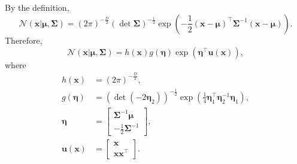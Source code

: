 \subsection{}
\label{2.57}
By the definition,
%
\begin{equation}
\mathcal{N} (\mathbf{x} | \bm{\mu}, \bm{\Sigma})
=
(2 \pi) ^ {- \frac{D}{2}}
(\det \bm{\Sigma}) ^ {- \frac{1}{2}}
\exp
\left(
	-
	\frac{1}{2}
	(\mathbf{x} - \bm{\mu}) ^ \intercal
	\bm{\Sigma} ^ {- 1}
	(\mathbf{x} - \bm{\mu})
\right).
\end{equation}
%
Therefore,
%
\begin{equation}
\mathcal{N} (\mathbf{x} | \bm{\mu}, \bm{\Sigma})
=
h(\mathbf{x})
g(\bm{\eta})
\exp
\left(
	\bm{\eta} ^ \intercal
	\mathbf{u} (\mathbf{x})
\right),
\end{equation}
%
where
\[
\begin{aligned}
h(\mathbf{x})
&=
(2 \pi) ^ {- \frac{D}{2}}, 
\\
g(\bm{\eta})
&=
(\det (- 2 \bm{\eta}_2)) ^ {- \frac{1}{2}}
\exp
\left(
	\frac{1}{4}
	\bm{\eta}_1 ^ \intercal
	\bm{\eta}_2 ^ {- 1}
	\bm{\eta}_1
\right), 
\\
\bm{\eta}
&=
\begin{bmatrix}
\bm{\Sigma} ^ {- 1}
\bm{\mu} 
\\
-
\frac{1}{2}
\bm{\Sigma} ^ {- 1}
\end{bmatrix}
, 
\\
\mathbf{u} (\mathbf{x})
&=
\begin{bmatrix}
\mathbf{x} \\
\mathbf{x} \mathbf{x} ^ \intercal
\end{bmatrix}
.
\end{aligned}
\]


